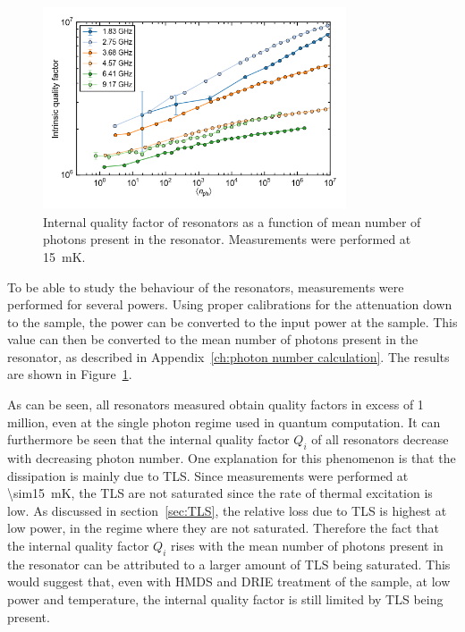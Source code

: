\begin{figure}
    \centering
    \includegraphics[width=0.8\textwidth]{Figures/DRIE/Qi_vs_n_photon.png}
    \caption{Internal quality factor of resonators as a function of mean number of photons present in the resonator. Measurements were performed at \SI{15}{\milli \kelvin}.}
    \label{fig:Qi_vs_n_photon}
\end{figure}
To be able to study the behaviour of the resonators, measurements were performed for several powers. Using proper calibrations for the attenuation down to the sample, the power can be converted to the input power at the sample. This value can then be converted to the mean number of photons present in the resonator, as described in Appendix~\ref{ch:photon number calculation}. The results are shown in Figure~\ref{fig:Qi_vs_n_photon}.

As can be seen, all resonators measured obtain quality factors in excess of 1 million, even at the single photon regime used in quantum computation. It can furthermore be seen that the internal quality factor $Q_i$ of all resonators decrease with decreasing photon number. One explanation for this phenomenon is that the dissipation is mainly due to TLS. Since measurements were performed at \SI{\sim15}{mK}, the TLS are not saturated since the rate of thermal excitation is low. As discussed in section~\ref{sec:TLS}, the relative loss due to TLS is highest at low power, in the regime where they are not saturated. Therefore the fact that the internal quality factor $Q_i$ rises with the mean number of photons present in the resonator can be attributed to a larger amount of TLS being saturated. This would suggest that, even with HMDS and DRIE treatment of the sample, at low power and temperature, the internal quality factor is still limited by TLS being present.

